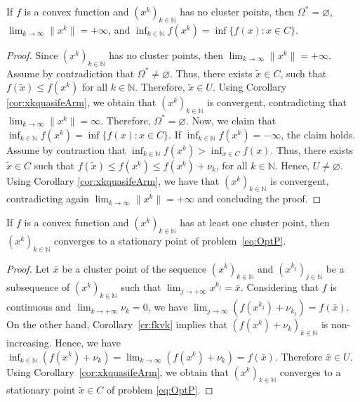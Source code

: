 \begin{theorem}
	If $f$ is a convex function and $(x^k)_{k\in\mathbb{N}}$ has no cluster points,  then $\Omega^* = \varnothing$, $\lim_{k \to \infty} \|x^k\|= +\infty$, and $\inf_{k\in {\mathbb N}} f(x^k) = \inf \{f(x) : x \in C\}$.
\end{theorem}
\begin{proof}
	Since $(x^k)_{k\in\mathbb{N}}$ has no cluster points, then $\lim_{k \to \infty} \|x^k\|= +\infty$. Assume by contradiction that $\Omega^* \neq  \varnothing$.  Thus, there exists  $\tilde{x}\in C$, such that  $f(\tilde{x}) \leq f(x^k)$ for all $k\in {\mathbb N}$. Therefore, $\tilde{x} \in U$. Using Corollary \ref{cor:xkquasifeArm}, we obtain that $(x^k)_{k\in\mathbb{N}}$ is convergent, contradicting that $\lim_{k \to \infty} \|x^k\|= \infty$. Therefore, $\Omega^* = \varnothing$. Now, we claim that $\inf_{k\in {\mathbb N}} f(x^k) = \inf \{f(x) : x \in C\}$.   If $\inf_{k\in {\mathbb N}} f(x^k) = -\infty$, the claim holds. Assume by contraction that   $\inf_{k\in {\mathbb N}} f(x^k) >  \inf_{x \in C} f(x)$.  Thus,  there exists $\tilde{x} \in C$ such that $f(\tilde{x}) \leq f(x^k)\leq f(x^k)+\nu_k $,  for all $k\in {\mathbb N}$.  Hence, $U \neq \varnothing$.  Using Corollary \ref{cor:xkquasifeArm}, we have that  $(x^k)_{k\in\mathbb{N}}$ is convergent, contradicting again $\lim_{k \to \infty} \|x^k\|= +\infty$ and concluding the proof.
\end{proof}

\begin{corollary}
	If $f$ is a convex function and $(x^k)_{k\in\mathbb{N}}$ has at least one cluster point, then    $(x^k)_{k\in\mathbb{N}}$ converges to a stationary point of problem~\eqref{eq:OptP}.
\end{corollary}
\begin{proof}
	Let $\bar{x}$ be a cluster point of  the sequence $(x^k)_{k\in\mathbb{N}}$ and $(x^{k_j})_{j\in\mathbb{N}}$ be a subsequence of $(x^k)_{k\in\mathbb{N}}$ such that $\lim_{j\to +\infty} x^{k_j} = \bar{x}$. Considering that  $f$ is continuous and $\lim_{k\to +\infty} \nu_{k} = 0$, we have $\lim_{j \to \infty} (f(x^{k_j})+\nu_{k_j})= f(\bar{x})$.    On the other hand,  Corollary~\ref{cr:fkvk}   implies that   $(f(x^{k})+\nu_k)_{k\in\mathbb{N}}$ is non-increasing.  Hence, we have   $\inf_{k\in {\mathbb N}} (f(x^{k})+\nu_{k})=\lim_{k\to \infty} (f(x^{k})+\nu_{k})= f(\bar{x})$.  Therefore $\bar{x} \in U$. Using  Corollary~\ref{cor:xkquasifeArm}, we obtain that $(x^k)_{k\in\mathbb{N}}$ converges to a stationary point $\tilde{x}\in C$ of  problem \eqref{eq:OptP}.
\end{proof}


